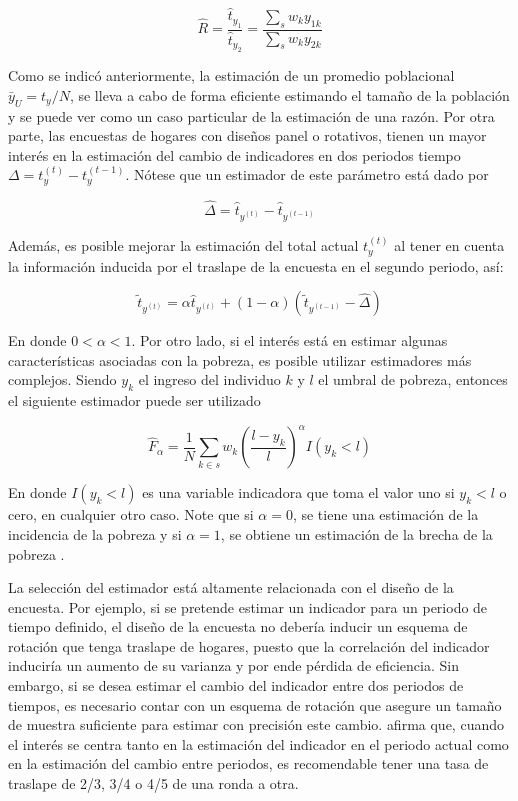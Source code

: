 \documentclass[
  10pt,
  spanish,
]{book}
\begin{document}
\[
\hat{R}= \frac{\hat{t}_{y_1}}{\hat{t}_{y_2}}
= \frac{\sum_s w_k y_{1k}} {\sum_s w_k y_{2k}}
\]

Como se indicó anteriormente, la estimación de un promedio poblacional \(\bar{y}_U = t_y / N\), se lleva a cabo de forma eficiente estimando el tamaño de la población y se puede ver como un caso particular de la estimación de una razón. Por otra parte, las encuestas de hogares con diseños panel o rotativos, tienen un mayor interés en la estimación del cambio de indicadores en dos periodos tiempo \(\Delta = t_y^{(t)} - t_y^{(t-1)}\). Nótese que un estimador de este parámetro está dado por

\[
\hat{\Delta} = \hat{t}_{y^{(t)}} - \hat{t}_{y^{(t-1)}}
\]

Además, es posible mejorar la estimación del total actual \(t_y^{(t)}\) al tener en cuenta la información inducida por el traslape de la encuesta en el segundo periodo, así:

\[
\tilde{t}_{y^{(t)}} = \alpha \hat{t}_{y^{(t)}} 
+ (1 -\alpha) (\tilde{t}_{y^{(t-1)}} - \hat{\Delta})
\]

En donde \(0 < \alpha < 1\). Por otro lado, si el interés está en estimar algunas características asociadas con la pobreza, es posible utilizar estimadores más complejos. Siendo \(y_k\) el ingreso del individuo \(k\) y \(l\) el umbral de pobreza, entonces el siguiente estimador puede ser utilizado

\[
\hat{F}_{\alpha}=\frac{1}{N}\sum_{k\in s} w_k 
\left(\frac{l-y_k}{l}\right)^{\alpha}I(y_k<l)
\]

En donde \(I(y_k<l)\) es una variable indicadora que toma el valor uno si \(y_k<l\) o cero, en cualquier otro caso. Note que si \(\alpha = 0\), se tiene una estimación de la incidencia de la pobreza y si \(\alpha = 1\), se obtiene un estimación de la brecha de la pobreza \citep{Foster_Greer_Thorbecke_1984}.

La selección del estimador está altamente relacionada con el diseño de la encuesta. Por ejemplo, si se pretende estimar un indicador para un periodo de tiempo definido, el diseño de la encuesta no debería inducir un esquema de rotación que tenga traslape de hogares, puesto que la correlación del indicador induciría un aumento de su varianza y por ende pérdida de eficiencia. Sin embargo, si se desea estimar el cambio del indicador entre dos periodos de tiempos, es necesario contar con un esquema de rotación que asegure un tamaño de muestra suficiente para estimar con precisión este cambio. \citet[sección 12.13]{Cochran_1977} afirma que, cuando el interés se centra tanto en la estimación del indicador en el periodo actual como en la estimación del cambio entre periodos, es recomendable tener una tasa de traslape de 2/3, 3/4 o 4/5 de una ronda a otra.
\end{document}
